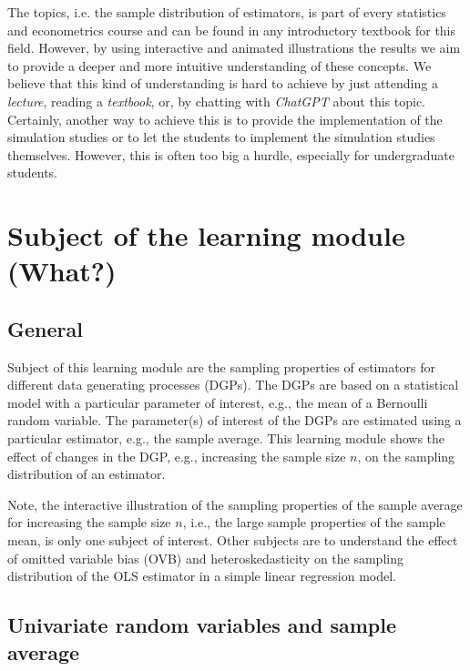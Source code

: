 \documentclass[12pt]{article}
\begin{document}
The topics, i.e. the sample distribution of estimators, is part of every statistics and econometrics course and can be found in any introductory textbook for this field. 
%
However, by using interactive and animated illustrations the results we aim to provide a deeper and more intuitive understanding of these concepts. 
%
We believe that this kind of understanding is hard to achieve by just attending a \emph{lecture}, reading a \emph{textbook}, or, by chatting with \emph{ChatGPT} about this topic. 
%
Certainly, another way to achieve this is to provide the implementation of the simulation studies or to let the students to implement the simulation studies themselves. 
%
However, this is often too big a hurdle, especially for undergraduate students. 

\section{Subject of the learning module (What?)}\label{SecWha}

\subsection{General}\label{SecWhaGen}

Subject of this learning module are the sampling properties of estimators for different data generating processes (DGPs). 
%
The DGPs are based on a statistical model with a particular parameter of interest, e.g., the mean of a Bernoulli random variable. 
%
The parameter(s) of interest of the DGPs are estimated using a particular estimator, e.g., the sample average. 
%
This learning module shows the effect of changes in the DGP, e.g., increasing the sample size $n$, on the sampling distribution of an estimator. 

Note, the interactive illustration of the sampling properties of the sample average for increasing the sample size $n$, i.e., the large sample properties of the sample mean, is only one subject of interest. 
%
Other subjects are to understand the effect of omitted variable bias (OVB) and heteroskedasticity on the sampling distribution of the OLS estimator in a simple linear regression model.

\subsection{Univariate random variables and sample average}\label{SecWha01}
\end{document}
